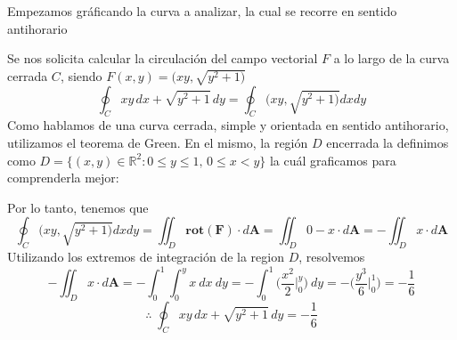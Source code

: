 \begin{solution}
    Empezamos gráficando la curva a analizar, la cual se recorre en sentido antihorario
   \begin{center}
\end{center}
    Se nos solicita calcular la circulación del campo vectorial $F$ a lo largo de la curva cerrada $C$, siendo $F(x,y)=(xy,\sqrt{y^2+1)}$
    \[
\oint_C xy \, dx + \sqrt{y^2+1} \, dy = \oint_C(xy,\sqrt{y^2+1)}dxdy
\]
Como hablamos de una curva cerrada, simple y orientada en sentido antihorario, utilizamos el teorema de Green. En el mismo, la región $D$ encerrada la definimos como $D = \{ (x, y) \in \mathbb{R}^2 : 0 \leq y \leq 1, \, 0 \leq x < y \}$ la cuál graficamos para comprenderla mejor:
  \begin{center}
    \end{center}

Por lo tanto, tenemos que 
\[
 \oint_C(xy,\sqrt{y^2+1)}dxdy=\iint _D \mathbf{rot(F)}\cdot d\mathbf{A}=\iint _D 0-x\cdot d\mathbf{A}=-\iint _D x\cdot d\mathbf{A}
\]
Utilizando los extremos de integración de la region $D$, resolvemos
 \[
         -\iint _D x\cdot d\mathbf{A}=-\int_0^1  \int_0^{y}   x\:dx\:dy =-  \int_0^1\Big( \frac{x^2}{2}\Big|_0^y \Big) \:dy=-\Big( \frac{y^3}{6}\Big|_0^1 \Big)=-\frac{1}{6}
    \]
$$\therefore\;\oint_C xy \, dx + \sqrt{y^2+1} \, dy =-\frac{1}{6}$$


\end{solution}

